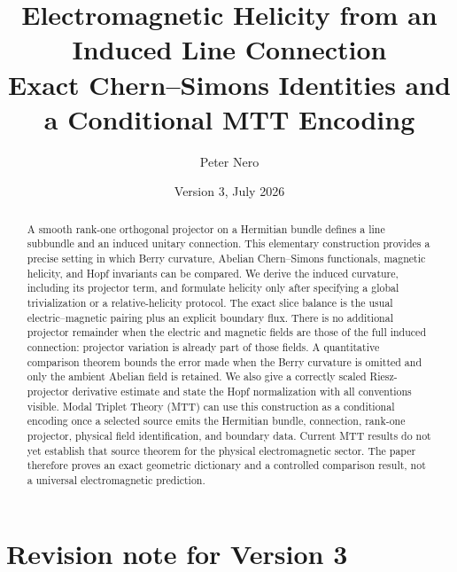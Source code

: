 \documentclass[11pt]{article}
\title{\bf Electromagnetic Helicity from an Induced Line Connection\\
{\large Exact Chern--Simons Identities and a Conditional MTT Encoding}}
\author{Peter Nero}
\date{Version 3, July 2026}
\begin{document}
\maketitle

\begin{abstract}
A smooth rank-one orthogonal projector on a Hermitian bundle defines a line
subbundle and an induced unitary connection.  This elementary construction
provides a precise setting in which Berry curvature, Abelian Chern--Simons
functionals, magnetic helicity, and Hopf invariants can be compared.  We derive
the induced curvature, including its projector term, and formulate helicity only
after specifying a global trivialization or a relative-helicity protocol.  The
exact slice balance is the usual electric--magnetic pairing plus an explicit
boundary flux.  There is no additional projector remainder when the electric
and magnetic fields are those of the full induced connection: projector
variation is already part of those fields.  A quantitative comparison theorem
bounds the error made when the Berry curvature is omitted and only the ambient
Abelian field is retained.  We also give a correctly scaled Riesz-projector
derivative estimate and state the Hopf normalization with all conventions
visible.  Modal Triplet Theory (MTT) can use this construction as a conditional
encoding once a selected source emits the Hermitian bundle, connection,
rank-one projector, physical field identification, and boundary data.  Current
MTT results do not yet establish that source theorem for the physical
electromagnetic sector.  The paper therefore proves an exact geometric
dictionary and a controlled comparison result, not a universal electromagnetic
prediction.
\end{abstract}

\tableofcontents

\section*{Revision note for Version 3}
\end{document}
